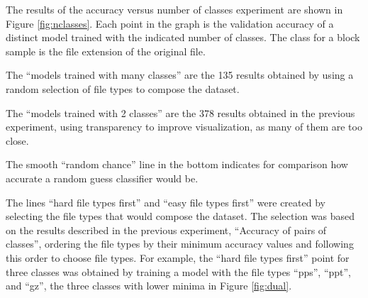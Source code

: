 The results of the accuracy versus number of classes experiment are shown in Figure \ref{fig:nclasses}.  Each point in the graph is the validation accuracy of a distinct model trained with the indicated number of classes. The class for a block sample is the file extension of the original file. 

The ``models trained with many classes'' are the 135 results obtained by using a random selection of file types to compose the dataset.

The ``models trained with 2 classes'' are the 378 results obtained in the previous experiment, using transparency to improve visualization, as many of them are too close. 

The smooth ``random chance'' line in the bottom indicates for comparison how accurate a random guess classifier would be.


The lines ``hard file types first'' and ``easy file types first'' were created by selecting the file types that would compose the dataset. The selection was based on the results described in the previous experiment, ``Accuracy of pairs of classes'', ordering the file types by their minimum accuracy values and following this order to choose file types. For example, the ``hard file types first'' point for three classes was obtained by training a model with the file types ``pps'', ``ppt'', and ``gz'', the three classes with lower minima in Figure \ref{fig:dual}.

